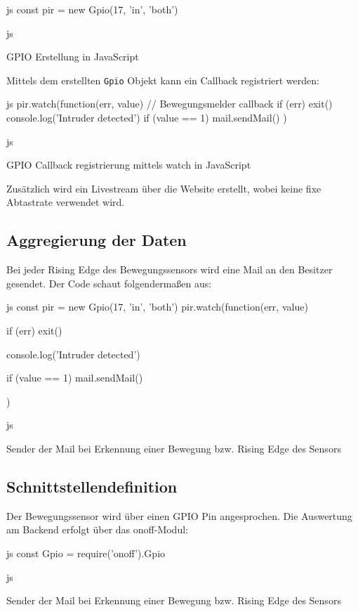 \begin{listing}
    \begin{code}{js}
    const pir = new Gpio(17, 'in', 'both')
    \end{code}{js}
    \caption{GPIO Erstellung in JavaScript}
\end{listing}

Mittels dem erstellten \texttt{Gpio} Objekt kann ein Callback registriert werden:

\begin{listing}
    \begin{code}[firstnumber=last]{js}
    pir.watch(function(err, value) {
        // Bewegungsmelder callback
        if (err) exit()
        console.log('Intruder detected')
        if (value == 1) {
            mail.sendMail()
        }
    })
    \end{code}{js}
    \caption{GPIO Callback registrierung mittels watch in JavaScript}
\end{listing}

Zusätzlich wird ein Livestream über die Website erstellt, wobei keine fixe Abtastrate verwendet wird.

\clearpage
\subsection{Aggregierung der Daten}
Bei jeder Rising Edge des Bewegungssensors wird eine Mail an den Besitzer gesendet. Der Code schaut folgendermaßen aus:
\begin{listing}
    \begin{code}[firstnumber=last]{js}
    const pir = new Gpio(17, 'in', 'both')
    pir.watch(function(err, value) {
        if (err) exit()

        console.log('Intruder detected')

        if (value == 1) {
            mail.sendMail()
        }
    })
    \end{code}{js}
    \caption{Sender der Mail bei Erkennung einer Bewegung bzw. Rising Edge des Sensors}
\end{listing}

\subsection{Schnittstellendefinition}
Der Bewegungssensor wird über einen GPIO Pin angesprochen. Die Auswertung am Backend erfolgt über das onoff-Modul:
\begin{listing}
    \begin{code}[firstnumber=last]{js}
        const Gpio = require('onoff').Gpio
    \end{code}{js}
    \caption{Sender der Mail bei Erkennung einer Bewegung bzw. Rising Edge des Sensors}
\end{listing}
